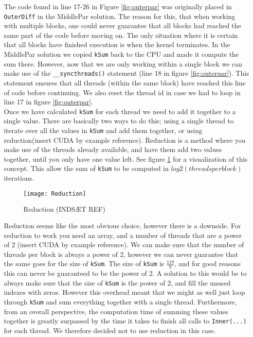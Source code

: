 The code found in line 17-26 in Figure \ref{fig:outerpar} was originally placed in \texttt{OuterDiff} in the MiddlePar solution. The reason for this, that when working with multiple blocks, one could never guarantee that all blocks had reached the same part of the code before moving on. The only situation where it is certain that all blocks have finished execution is when the kernel terminates. In the MiddlePar solution we copied \texttt{kSum} back to the CPU and made it compute the sum there. However, now that we are only working within a single block we can make use of the \texttt{\_\_syncthreads()} statement (line 18 in figure \ref{fig:outerpar}). This statement ensures that all threads (within the same block) have reached this line of code before continuing. We also reset the thread id in case we had to loop in line 17 in figure \ref{fig:outerpar}. \\

Once we have calculated \texttt{kSum} for each thread we need to add it together to a single value. There are basically two ways to do this; using a single thread to iterate over all the values in \texttt{kSum} and add them together, or using reduction(insert CUDA by example reference). Reduction is a method where you make use of the threads already available, and have them add two values together, until you only have one value left. See figure \ref{fig:reduction} for a visualization of this concept. This allow the sum of \texttt{kSum} to be computed in $log2(threadsperblock)$ iterations.\\

\begin{figure}[ht!]
  \centering
    \texttt{[image: Reduction]}
  \caption{Reduction (INDSÆT REF)}
  \label{fig:reduction}
\end{figure}

Reduction seems like the most obvious choice, however there is a downside. For reduction to work you need an array, and a number of threads that are a power of 2 (insert CUDA by example reference). We can make sure that the number of threads per block is always a power of 2, however we can never guarantee that the same goes for the size of \texttt{kSum}. The size of \texttt{kSum} is $\frac{119}{h}$, and for good reasons this can never be guaranteed to be the power of 2. A solution to this would be to always make sure that the size of \texttt{kSum} is the power of 2, and fill the unused indexes with zeros. However this overhead meant that we might as well just loop through \texttt{kSum} and sum everything together with a single thread. Furthermore, from an overall perspective, the computation time of summing these values together is greatly surpassed by the time it takes to finish all calls to \texttt{Inner(...)} for each thread. We therefore decided not to use reduction in this case.\\

